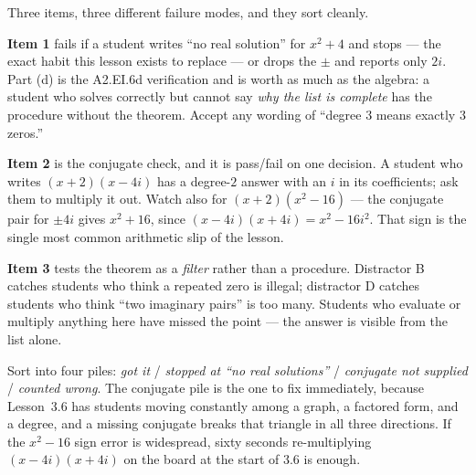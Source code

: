 \documentclass[10pt]{article}
\begin{document}
\begin{teachernote}
Three items, three different failure modes, and they sort cleanly.

\vspace{3pt}
\textbf{Item 1} fails if a student writes ``no real solution'' for $x^2+4$ and stops --- the exact
habit this lesson exists to replace --- or drops the $\pm$ and reports only $2i$. Part (d) is the
A2.EI.6d verification and is worth as much as the algebra: a student who solves correctly but cannot
say \emph{why the list is complete} has the procedure without the theorem. Accept any wording of
``degree $3$ means exactly $3$ zeros.''

\vspace{3pt}
\textbf{Item 2} is the conjugate check, and it is pass/fail on one decision. A student who writes
$(x+2)(x-4i)$ has a degree-$2$ answer with an $i$ in its coefficients; ask them to multiply it out.
Watch also for $(x+2)(x^2-16)$ --- the conjugate pair for $\pm 4i$ gives $x^2 + 16$, since
$(x-4i)(x+4i) = x^2 - 16i^2$. That sign is the single most common arithmetic slip of the lesson.

\vspace{3pt}
\textbf{Item 3} tests the theorem as a \emph{filter} rather than a procedure. Distractor B catches
students who think a repeated zero is illegal; distractor D catches students who think ``two
imaginary pairs'' is too many. Students who evaluate or multiply anything here have missed the point
--- the answer is visible from the list alone.

\vspace{3pt}
Sort into four piles: \emph{got it} / \emph{stopped at ``no real solutions''} / \emph{conjugate not
supplied} / \emph{counted wrong}. The conjugate pile is the one to fix immediately, because
Lesson~3.6 has students moving constantly among a graph, a factored form, and a degree, and a missing
conjugate breaks that triangle in all three directions. If the $x^2-16$ sign error is widespread,
sixty seconds re-multiplying $(x-4i)(x+4i)$ on the board at the start of 3.6 is enough.
\end{teachernote}
\end{document}
